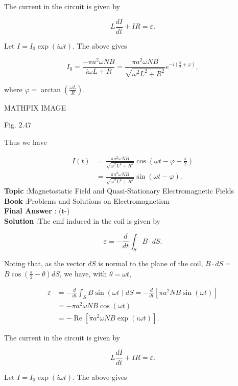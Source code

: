\documentclass[10pt]{article}
\begin{document}
The current in the circuit is given by

$$
L \frac{d I}{d t}+I R=\varepsilon .
$$

Let $I=I_{0} \exp (i \omega t)$. The above gives

$$
I_{0}=\frac{-\pi a^{2} \omega N B}{i \omega L+R}=\frac{\pi a^{2} \omega N B}{\sqrt{\omega^{2} L^{2}+R^{2}}} e^{-i\left(\frac{5}{2}+\varphi\right)},
$$

where $\varphi=\arctan \left(\frac{\omega L}{R}\right)$.

MATHPIX IMAGE

Fig. $2.47$

Thus we have

$$
\begin{aligned}
I(t) &=\frac{\pi a^{2} \omega N B}{\sqrt{\omega^{2} L^{2}+R^{2}}} \cos \left(\omega t-\varphi-\frac{\pi}{2}\right) \\
&=\frac{\pi a^{2} \omega N B}{\sqrt{\omega^{2} L^{2}+R^{2}}} \sin (\omega t-\varphi) .
\end{aligned}
$$
\textbf{Topic} :Magnetostatic Field and Quasi-Stationary Electromagnetic Fields\\
\textbf{Book} :Problems and Solutions on Electromagnetism\\
\textbf{Final Answer} : \sin (\omega t-\varphi)\\


\textbf{Solution} :The emf induced in the coil is given by

$$
\varepsilon=-\frac{d}{d t} \int_{S} B \cdot d S .
$$

Noting that, as the vector $d S$ is normal to the plane of the coil, $B \cdot d S=$ $B \cos \left(\frac{\pi}{2}-\theta\right) d S$, we have, with $\theta=\omega t$,

$$
\begin{aligned}
\varepsilon &=-\frac{d}{d t} \int_{S} B \sin (\omega t) d S=-\frac{d}{d t}\left[\pi a^{2} N B \sin (\omega t)\right] \\
&=-\pi a^{2} \omega N B \cos (\omega t) \\
&=-\operatorname{Re}\left[\dot{\pi} a^{2} \omega N B \exp (i \omega t)\right] .
\end{aligned}
$$

The current in the circuit is given by

$$
L \frac{d I}{d t}+I R=\varepsilon .
$$

Let $I=I_{0} \exp (i \omega t)$. The above gives
\end{document}
